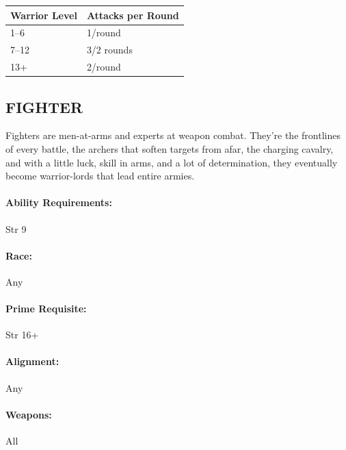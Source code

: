 \begin{multicols}{2}

\noindent
\begin{minipage}{\columnwidth}

\label{warriorattacks}
\noindent
\begin{tabular}{|m{}|m{}|}
\hline
Warrior Level	& Attacks per Round \\
\hline\hline
\rowcolor[gray]{.9}1--6		& 1/round \\
7--12	& 3/2 rounds \\
\rowcolor[gray]{.9}13+		& 2/round \\
\hline
\end{tabular}

\end{minipage}

\subsection{FIGHTER}

Fighters are men-at-arms and experts at weapon combat.  They're the frontlines of every battle, the archers that soften targets from afar, the charging cavalry, and with a little luck, skill in arms, and a lot of determination, they eventually become warrior-lords that lead entire armies.

\paragraph{Ability Requirements:} Str 9

\paragraph{Race:} Any

\paragraph{Prime Requisite:} Str 16+

\paragraph{Alignment:} Any

\paragraph{Weapons:} All


\end{multicols}
